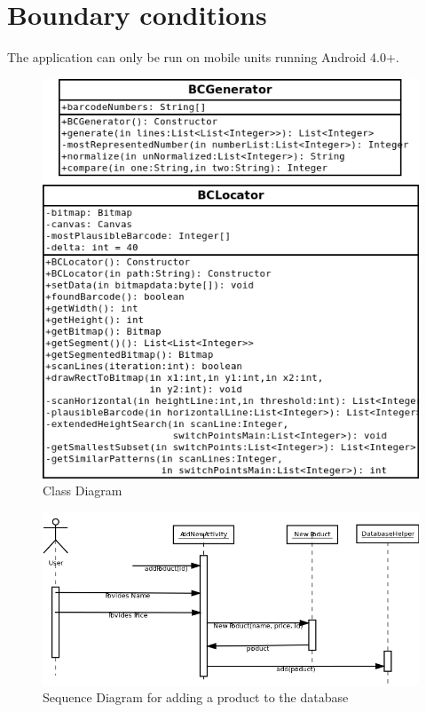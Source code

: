 \documentclass{report}
\begin{document}
\section{Boundary conditions}
The application can only be run on mobile units running Android 4.0+.




\appendix

\pagebreak

\begin{figure}[H]
		\centering
		\includegraphics[width=\textwidth]{classdiagramcore.png}
		\caption{Class Diagram}
		\label{fig:Class Diagram for Core package.}
\end{figure}

\pagebreak

\begin{figure}[H]
		\centering
		\includegraphics[width=\textwidth]{sequencediagram.png}
		\caption{Sequence Diagram for adding a product to the database}
		\label{fig:Sequence Diagram 1}
\end{figure}
\end{document}
